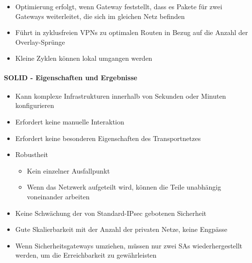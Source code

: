 \documentclass[a4paper]{article}
\begin{document}
\begin{multicols}{3}
\begin{itemize}
              \begin{itemize}
                  \item
                        Optimierung erfolgt, wenn Gateway feststellt, dass es Pakete für
                        zwei Gateways weiterleitet, die sich im gleichen Netz befinden
                  \item
                        Führt in zyklusfreien VPNs zu optimalen Routen in Bezug auf die
                        Anzahl der Overlay-Sprünge
                  \item
                        Kleine Zyklen können lokal umgangen werden
              \end{itemize}
    \end{itemize}


    \paragraph{SOLID - Eigenschaften und
        Ergebnisse}

    \begin{itemize}
        \item
              Kann komplexe Infrastrukturen innerhalb von Sekunden oder Minuten
              konfigurieren
        \item
              Erfordert keine manuelle Interaktion
        \item
              Erfordert keine besonderen Eigenschaften des Transportnetzes
        \item
              Robustheit

              \begin{itemize}
                  \item
                        Kein einzelner Ausfallpunkt
                  \item
                        Wenn das Netzwerk aufgeteilt wird, können die Teile unabhängig
                        voneinander arbeiten
              \end{itemize}
        \item
              Keine Schwächung der von Standard-IPsec gebotenen Sicherheit
        \item
              Gute Skalierbarkeit mit der Anzahl der privaten Netze, keine Engpässe
        \item
              Wenn Sicherheitsgateways umziehen, müssen nur zwei SAs
              wiederhergestellt werden, um die Erreichbarkeit zu gewährleisten
    \end{itemize}



\end{multicols}
\end{document}
